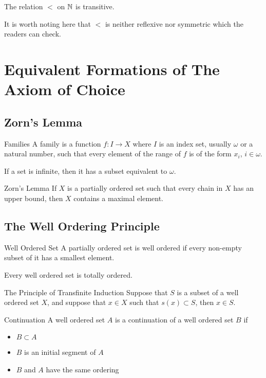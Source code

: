 \documentclass[a4paper]{article}
\begin{document}
\begin{prp}{}{} The relation $<$ on $\mathbb{N}$ is transitive. 
\end{prp}

It is worth noting here that $<$ is neither reflexive nor symmetric which the readers can check. 

\pagebreak
\section{Equivalent Formations of The Axiom of Choice}
\subsection{Zorn's Lemma}
\begin{defn}{Families}{} A family is a function $f:I\to X$ where $I$ is an index set, usually $\omega$ or a natural number, such that every element of the range of $f$ is of the form $x_i$, $i\in\omega$. 
\end{defn}

\begin{thm}{}{} If a set is infinite, then it has a subset equivalent to $\omega$. 
\end{thm}

\begin{thm}{Zorn's Lemma}{} If $X$ is a partially ordered set such that every chain in $X$ has an upper bound, then $X$ contains a maximal element. 
\end{thm}

\subsection{The Well Ordering Principle}
\begin{defn}{Well Ordered Set}{} A partially ordered set is well ordered if every non-empty subset of it has a smallest element. 
\end{defn}

\begin{thm}{}{} Every well ordered set is totally ordered. 
\end{thm}

\begin{thm}{The Principle of Transfinite Induction}{} Suppose that $S$ is a subset of a well ordered set $X$, and suppose that $x\in X$ such that $s(x)\subset S$, then $x\in S$. 
\end{thm}

\begin{defn}{Continuation}{} A well ordered set $A$ is a continuation of a well ordered set $B$ if
\begin{itemize}
\item $B\subset A$
\item $B$ is an initial segment of $A$
\item $B$ and $A$ have the same ordering
\end{itemize}
\end{defn}
\end{document}
